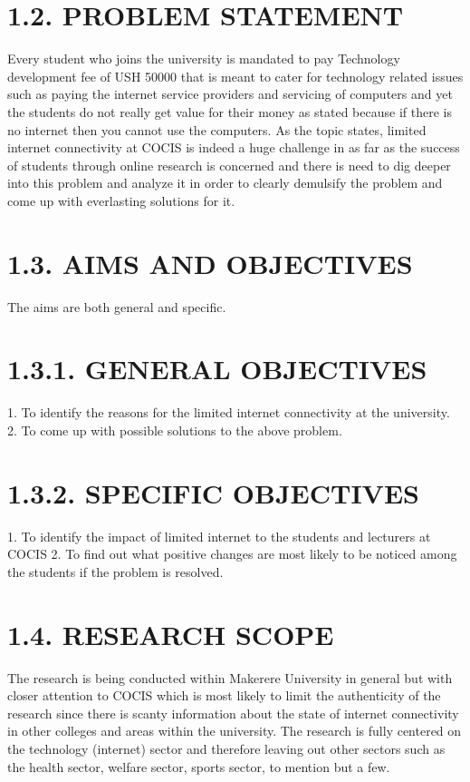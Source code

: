 \documentclass[11pt]{article}
\begin{document}
\section{1.2.	PROBLEM STATEMENT}
       Every student who joins the university is mandated to pay Technology development fee of USH 50000 that is meant to cater for technology related issues such as paying the internet service providers and servicing of computers and yet the students do not really get value for their money as stated because if there is no internet then you cannot use the computers.
      As the topic states, limited internet connectivity at COCIS is indeed a huge challenge in as far as the success of students through online research is concerned and there is need to dig deeper into this problem and analyze it in order to clearly demulsify the problem and come up with everlasting solutions for it.

\section{1.3.	AIMS AND OBJECTIVES}
      The aims are both general and specific.

\section{1.3.1.	GENERAL OBJECTIVES}
1.	To identify the reasons for the limited internet connectivity at the university.
2.	To come up with possible solutions to the above problem.

\section{1.3.2.	SPECIFIC OBJECTIVES}
1.	To identify the impact of limited internet to the students and lecturers at COCIS
2.	To find out what positive changes are most likely to be noticed among the students if the problem is resolved.
         
\section{1.4.	RESEARCH SCOPE}
       The research is being conducted within Makerere University in general but with closer attention to COCIS which is most likely to limit the authenticity of the research since there is scanty information about the state of internet connectivity in other colleges and areas within the university.
     The research is fully centered on the technology (internet) sector and therefore leaving out other sectors such as the health sector, welfare sector, sports sector, to mention but a few.
\end{document}
